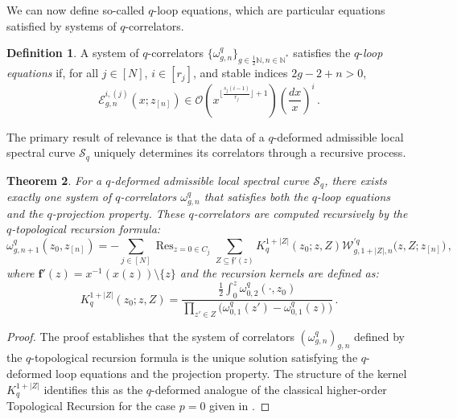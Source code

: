 \documentclass[reqno,11pt]{amsart}
\theoremstyle{plain}
\newtheorem{theorem}{Theorem}[section]
\theoremstyle{definition}
\newtheorem{definition}[theorem]{Definition}
\theoremstyle{remark}
\numberwithin{equation}{section}
\newcommand{\mb}[1]{\mathbb{#1}}
\newcommand{\mf}[1]{\mathfrak{#1}}
\newcommand{\mc}[1]{\mathcal{#1}}
\newcommand{\1}{\mathds{1}}
\newcommand{\N}{\mb{N}}
\newcommand{\2}{\frac{1}{2}}
\DeclareMathOperator*{\Res}{Res}
\begin{document}
{				We can now define so-called $q$-loop equations, which are particular equations satisfied by systems of $q$-correlators.
				\begin{definition}
					A system of $q$-correlators $ \{ \omega^{q}_{g,n} \}_{g \in \frac{1}{2} \N, n\in \N^*}$  satisfies the $q$-\emph{loop equations} if, for all $j \in [N]$, $i \in [r_j]$, and stable indices $2g-2+n > 0$,
					\begin{equation}
						\mathcal{E}^{i,(j)}_{g,n} (x; z_{[n]}) \in  \mc{O} \left( x^{ \lfloor \frac{s_j(i-1)}{r_j}\rfloor + 1} \right) \left( \frac{dx}{x}\right)^i \,.
					\end{equation}
				\end{definition}
				
				The primary result of relevance is that the data of a $q$-deformed admissible local  spectral curve $\mathcal{S}_q$ uniquely determines its correlators through a recursive process.
				\begin{theorem}\label{UnshiftedTR}
					For a $q$-deformed admissible local  spectral curve $\mathcal{S}_q$, there exists exactly one system of $q$-correlators $\omega^{q}_{g,n}$ that satisfies both the $q$-loop equations and the $q$-projection property. These $q$-correlators are computed recursively by the $q$-\emph{topological recursion formula}:
					\begin{equation}
						\omega^{q}_{g,n+1}(z_0, z_{[n]}) = -\sum_{ j \in [N]} \Res_{z = 0 \in C_j} \sum_{Z \subseteq \mf{f}' (z)} K_q^{1 + |Z|}(z_0; z, Z) \mathcal{W}^{'q}_{g,1+|Z|,n}\big(z,Z; z_{[n]}\big)\,,
					\end{equation}
					where $ \mathbf{f}'(z) = x^{-1}(x(z)) \setminus \{z \}$ and the \emph{recursion kernels} are defined as:
					\begin{equation}
						K^{1+|Z|}_q (z_0; z, Z) = \frac{\frac{1}{2}\int_0^z \omega^{q}_{0,2} (\mathord{\cdot}, z_0)}{\prod_{z' \in Z} \big( \omega^{q}_{0,1}(z') - \omega^{q}_{0,1}(z) \big)} \, .
					\end{equation}
				\end{theorem}
				\begin{proof}
					{The proof establishes that the system of correlators $(\omega^q_{g,n})_{g,n}$ defined by the $q$-topological recursion formula is the unique solution satisfying the $q$-deformed loop equations and the projection property. The structure of the kernel $K_q^{1+|Z|}$ identifies this as the $q$-deformed analogue of the classical higher-order Topological Recursion for the case $p=0$ given in \cite{BBCKS}.}
					

\end{proof}}
\end{document}
